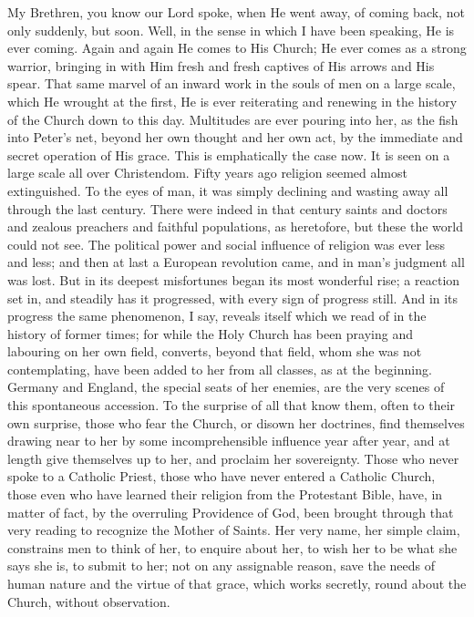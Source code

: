 My Brethren, you know our Lord spoke, when He went
away, of coming back, not only suddenly, but soon. Well,
in the sense in which I have been speaking, He is ever
coming. Again and again He comes to His Church; He ever
comes as a strong warrior, bringing in with Him fresh and
fresh captives of His arrows and His spear. That same
marvel of an inward work in the souls of men on a large
scale, which He wrought at the first, He is ever
reiterating and renewing in the history of the Church
down to this day. Multitudes are ever pouring into her,
as the fish into Peter's net, beyond her own thought and
her own act, by the immediate and secret operation of His
grace. This is emphatically the case now. It is seen on a
large scale all over Christendom. Fifty years ago
religion seemed almost extinguished. To the eyes of man,
it was simply declining and wasting away all through the
last century. There were indeed in that century saints
and doctors and zealous preachers and faithful
populations, as heretofore, but these the world could not
see. The political power and social influence of religion
was ever less and less; and then at last a European
revolution came, and in man's judgment all was lost. But
in its deepest misfortunes began its most wonderful rise;
a reaction set in, and steadily has it progressed, with
every sign of progress still. And in its progress the
same phenomenon, I say, reveals itself which we read of
in the history of former times; for while the Holy Church
has been praying and labouring on her own field,
converts, beyond that field, whom she was not
contemplating, have been added to her from all classes,
as at the beginning. Germany and England, the special
seats of her enemies, are the very scenes of this
spontaneous accession. To the surprise of all that know
them, often to their own surprise, those who fear the
Church, or disown her doctrines, find themselves drawing
near to her by some incomprehensible influence year after
year, and at length give themselves up to her, and
proclaim her sovereignty. Those who never spoke to a
Catholic Priest, those who have never entered a Catholic
Church, those even who have learned their religion from
the Protestant Bible, have, in matter of fact, by the
overruling Providence of God, been brought through that
very reading to recognize the Mother of Saints. Her very
name, her simple claim, constrains men to think of her,
to enquire about her, to wish her to be what she says she
is, to submit to her; not on any assignable reason, save
the needs of human nature and the virtue of that grace,
which works secretly, round about the Church, without
observation.

